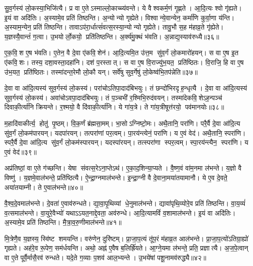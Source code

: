 सु॒व॒र्गस्य॑ लो॒कस्या॒भिजि॑त्यै। प्र वा ए॒तेऽस्माल्लो॒काच्च्य॑वन्ते। ये वैश्वकर्म॒णं गृ॒ह्णते। आ॒दि॒त्यः श्वो गृ॑ह्यते। इ॒यं वा अदि॑तिः। अ॒स्यामे॒व प्रति॑ तिष्ठन्ति। अ॒न्योन्यो गृह्येते। विश्वान्ये॒वान्येन॒ कर्मा॑णि कुर्वा॒णा य॑न्ति। अ॒स्याम॒न्येन॒ प्रति॑ तिष्ठन्ति। तावाऽप॑रा॒र्धात्सं॑वत्स॒रस्या॒न्योन्यो गृह्येते। तावु॒भौ स॒ह म॑हाव्र॒ते गृ॑ह्येते। य॒ज्ञस्यै॒वान्तं॑ ग॒त्वा। उ॒भयोर्लो॒कयो॒ प्रति॑तिष्ठन्ति। अ॒र्क्य॑मु॒क्थं भ॑वति। अ॒न्नाद्य॒स्याव॑रुध्यै॥३६॥\anuvakamend[स॒मा॒यच्छ॑त्यतिग्रा॒ह्या॑ गृह्यन्ते गृ॒ह्यते॑ संवत्स॒रस्या॒न्योन्यो गृह्येते॒ पञ्च॑ च]

ए॒क॒वि॒श ए॒ष भ॑वति। ए॒तेन॒ वै दे॒वा ए॑कवि॒शेन॑। आ॒दि॒त्यमि॒त उ॑त्त॒म सु॑व॒र्गं लो॒कमारो॑हयन्। स वा ए॒ष इ॒त ए॑कवि॒शः। तस्य॒ दशा॒वस्ता॒दहा॑नि। दश॑ प॒रस्तात्। स वा ए॒ष वि॒राज्यु॑भ॒यत॒ प्रति॑ष्ठितः। वि॒राजि॒ हि वा ए॒ष उ॑भ॒यत॒ प्रति॑ष्ठितः। तस्मा॑दन्त॒रेमौ लो॒कौ यन्। सर्वे॑षु सुव॒र्गेषु॑ लो॒केष्व॑भि॒तप॑न्नेति॥३७॥

दे॒वा वा आ॑दि॒त्यस्य॑ सुव॒र्गस्य॑ लो॒कस्य॑। परा॑चोऽतिपा॒दाद॑बिभयुः। तं छन्दो॑भिरदृह॒न्धृत्यै। दे॒वा वा आ॑दि॒त्यस्य॑ सुव॒र्गस्य॑ लो॒कस्य॑। अवा॑चोऽवपा॒दाद॑बिभयुः। तं प॒ञ्चभी॑ र॒श्मिभि॒रुद॑वयन्। तस्मा॑देकवि॒शेऽह॒न्पञ्च॑ दिवाकी॒र्त्या॑नि क्रियन्ते। र॒श्मयो॒ वै दि॑वाकी॒र्त्या॑नि। ये गा॑य॒त्रे। ते गा॑य॒त्रीषूत्त॑रयो॒ पव॑मानयोः॥३८॥

म॒हादि॑वाकीर्त्य॒ होतु॑ पृ॒ष्ठम्। वि॒क॒र्णं ब्र॑ह्मसा॒मम्। भा॒सोऽग्निष्टो॒मः। अथै॒तानि॒ परा॑णि। परै॒र्वै दे॒वा आ॑दि॒त्य सु॑व॒र्गं लो॒कम॑पारयन्। यदपा॑रयन्। तत्परा॑णां पर॒त्वम्। पा॒रय॑न्त्येनं॒ परा॑णि। य ए॒वं वेद॑। अथै॒तानि॒ स्परा॑णि। स्परै॒र्वै दे॒वा आ॑दि॒त्य सु॑व॒र्गं लो॒कम॑स्पारयन्। यदस्पा॑रयन्। तत्स्परा॑णा स्पर॒त्वम्। स्पा॒रय॑न्त्यैन॒ स्परा॑णि। य ए॒वं वेद॑॥३९॥\anuvakamend[ए॒ति॒ पव॑मानयो॒ स्परा॑णि॒ पञ्च॑ च]

अप्र॑तिष्ठां॒ वा ए॒ते ग॑च्छन्ति। येषा संवत्स॒रेऽना॒प्तेऽथ॑। ए॒का॒द॒शिन्या॒प्यते। वै॒ष्ण॒वं वा॑म॒नमा ल॑भन्ते। य॒ज्ञो वै विष्णु॑। य॒ज्ञमे॒वाल॑भन्ते॒ प्रति॑ष्ठित्यै। ऐ॒न्द्रा॒ग्नमाल॑भन्ते। इ॒न्द्रा॒ग्नी वै दे॒वाना॒मया॑तयामानौ। ये ए॒व दे॒वते॒ अया॑तयाम्नी। ते ए॒वाल॑भन्ते॥४०॥

वै॒श्व॒दे॒वमाल॑भन्ते। दे॒वता॑ ए॒वाव॑रुन्धते। द्या॒वा॒पृ॒थिव्यां धे॒नुमाल॑भन्ते। द्यावा॑पृथि॒व्योरे॒व प्रति॑ तिष्ठन्ति। वा॒य॒व्यं॑ व॒त्समाल॑भन्ते। वा॒युरे॒वैभ्यो॑ यथाऽऽयत॒नाद्दे॒वता॒ अव॑रुन्धे। आ॒दि॒त्यामविं॑ व॒शामाल॑भन्ते। इ॒यं वा अदि॑तिः। अ॒स्यामे॒व प्रति॑ तिष्ठन्ति। मै॒त्रा॒व॒रु॒णीमाल॑भन्ते॥४१॥

मि॒त्रेणै॒व य॒ज्ञस्य॒ स्वि॑ष्ट शमयन्ति। वरु॑णेन॒ दुरि॑ष्टम्। प्रा॒जा॒प॒त्यं तू॑प॒रं म॑हाव्र॒त आल॑भन्ते। प्रा॒जा॒प॒त्यो॑ऽतिग्रा॒ह्यो॑ गृह्यते। अह॑रे॒व रू॒पेण॒ सम॑र्धयन्ति। अथो॒ अह्न॑ ए॒वैष ब॒लिर्ह्रि॑यते। आ॒ग्ने॒यमा ल॑भन्ते॒ प्रति॒ प्रज्ञात्यै। अ॒ज॒पे॒त्वान् वा ए॒ते पूर्वै॒र्मासै॒रव॑ रुन्धते। यदे॒ते ग॒व्याः प॒शव॑ आल॒भ्यन्ते। उ॒भये॑षां पशू॒नामव॑रुद्ध्यै॥४२॥

